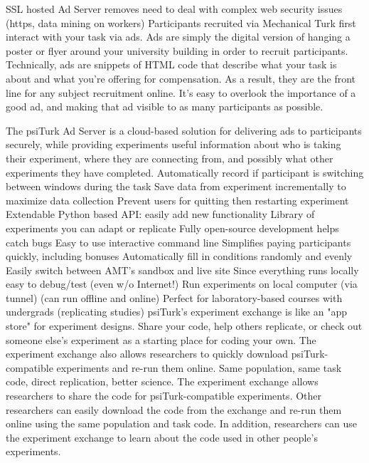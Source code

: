 \documentclass[jou,apacite]{apa6}
\begin{document}
SSL hosted Ad Server removes need to deal with complex web security issues (https, data mining on workers) 
Participants recruited via Mechanical Turk first interact with your task via ads. Ads are simply the digital version of hanging a poster or flyer around your university building in order to recruit participants. Technically, ads are snippets of HTML code that describe what your task is about and what you're offering for compensation. As a result, they are the front line for any subject recruitment online. It's easy to overlook the importance of a good ad, and making that ad visible to as many participants as possible.

The psiTurk Ad Server is a cloud-based solution for delivering ads to participants securely, while providing experiments useful information about who is taking their experiment, where they are connecting from, and possibly what other experiments they have completed.
Automatically record if participant is switching between windows during the task
Save data from experiment incrementally to maximize data collection
Prevent users for quitting then restarting experiment
Extendable Python based API: easily add new functionality
Library of experiments you can adapt or replicate
Fully open-source development helps catch bugs
Easy to use interactive command line
Simplifies paying participants quickly, including bonuses
Automatically fill in conditions randomly and evenly
Easily switch between AMT's sandbox and live site
Since everything runs locally easy to debug/test (even w/o Internet!)
Run experiments on local computer (via tunnel) (can run offline and online)
Perfect for laboratory-based courses with undergrads (replicating studies)
psiTurk's experiment exchange is like an "app store" for experiment designs. Share your code, help others replicate, or check out someone else's experiment as a starting place for coding your own. The experiment exchange also allows researchers to quickly download psiTurk-compatible experiments and re-run them online. Same population, same task code, direct replication, better science.
The experiment exchange allows researchers to share the code for psiTurk-compatible experiments. Other researchers can easily download the code from the exchange and re-run them online using the same population and task code. In addition, researchers can use the experiment exchange to learn about the code used in other people's experiments. 
\end{document}
